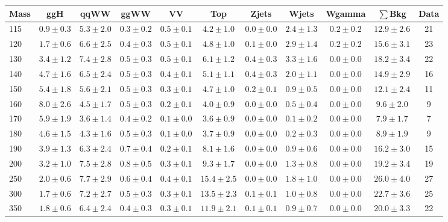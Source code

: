 \begin{table}
{\scriptsize
 \begin{center}
 \begin{tabular}{l c c c c c c c c c c }
 \hline
 Mass & ggH & qqWW & ggWW & VV & Top & Zjets & Wjets & Wgamma & $\sum$Bkg & Data \\
 \hline
115 & $0.9\pm0.3$ & $5.3\pm2.0$ & $0.3\pm0.2$ & $0.5\pm0.1$ & $4.2\pm1.0$ & $0.0\pm0.0$ & $2.4\pm1.3$ & $0.2\pm0.2$ & $12.9\pm2.6$ & 21 \\
120 & $1.7\pm0.6$ & $6.6\pm2.5$ & $0.4\pm0.3$ & $0.5\pm0.1$ & $4.8\pm1.0$ & $0.1\pm0.0$ & $2.9\pm1.4$ & $0.2\pm0.2$ & $15.6\pm3.1$ & 23 \\
130 & $3.4\pm1.2$ & $7.4\pm2.8$ & $0.5\pm0.3$ & $0.5\pm0.1$ & $6.1\pm1.2$ & $0.4\pm0.3$ & $3.3\pm1.6$ & $0.0\pm0.0$ & $18.2\pm3.4$ & 22 \\
140 & $4.7\pm1.6$ & $6.5\pm2.4$ & $0.5\pm0.3$ & $0.4\pm0.1$ & $5.1\pm1.1$ & $0.4\pm0.3$ & $2.0\pm1.1$ & $0.0\pm0.0$ & $14.9\pm2.9$ & 16 \\
150 & $5.4\pm1.8$ & $5.6\pm2.1$ & $0.5\pm0.3$ & $0.3\pm0.1$ & $4.7\pm1.0$ & $0.2\pm0.1$ & $0.9\pm0.5$ & $0.0\pm0.0$ & $12.1\pm2.4$ & 11 \\
160 & $8.0\pm2.6$ & $4.5\pm1.7$ & $0.5\pm0.3$ & $0.2\pm0.1$ & $4.0\pm0.9$ & $0.0\pm0.0$ & $0.5\pm0.4$ & $0.0\pm0.0$ & $9.6\pm2.0$ & 9 \\
170 & $5.9\pm1.9$ & $3.6\pm1.4$ & $0.4\pm0.2$ & $0.1\pm0.0$ & $3.6\pm0.9$ & $0.0\pm0.0$ & $0.1\pm0.2$ & $0.0\pm0.0$ & $7.9\pm1.7$ & 7 \\
180 & $4.6\pm1.5$ & $4.3\pm1.6$ & $0.5\pm0.3$ & $0.1\pm0.0$ & $3.7\pm0.9$ & $0.0\pm0.0$ & $0.2\pm0.3$ & $0.0\pm0.0$ & $8.9\pm1.9$ & 9 \\
190 & $3.9\pm1.3$ & $6.3\pm2.4$ & $0.7\pm0.4$ & $0.2\pm0.1$ & $8.1\pm1.6$ & $0.0\pm0.0$ & $0.9\pm0.6$ & $0.0\pm0.0$ & $16.2\pm3.0$ & 15 \\
200 & $3.2\pm1.0$ & $7.5\pm2.8$ & $0.8\pm0.5$ & $0.3\pm0.1$ & $9.3\pm1.7$ & $0.0\pm0.0$ & $1.3\pm0.8$ & $0.0\pm0.0$ & $19.2\pm3.4$ & 19 \\
250 & $2.0\pm0.6$ & $7.7\pm2.9$ & $0.6\pm0.4$ & $0.4\pm0.1$ & $15.4\pm2.5$ & $0.0\pm0.0$ & $1.8\pm1.0$ & $0.0\pm0.0$ & $26.0\pm4.0$ & 27 \\
300 & $1.7\pm0.6$ & $7.2\pm2.7$ & $0.5\pm0.3$ & $0.3\pm0.1$ & $13.5\pm2.3$ & $0.1\pm0.1$ & $1.0\pm0.8$ & $0.0\pm0.0$ & $22.7\pm3.6$ & 25 \\
350 & $1.8\pm0.6$ & $6.4\pm2.4$ & $0.4\pm0.3$ & $0.3\pm0.1$ & $11.9\pm2.1$ & $0.1\pm0.1$ & $0.9\pm0.7$ & $0.0\pm0.0$ & $20.0\pm3.3$ & 22 \\

\end{tabular}
\end{center}}
\end{table}

